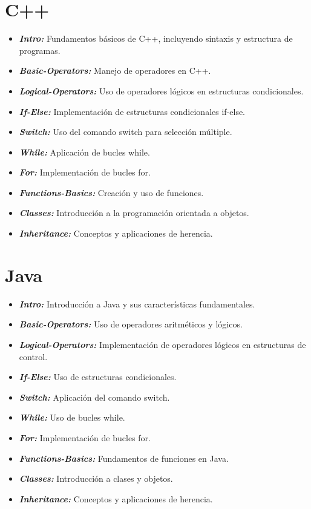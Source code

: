 \begin{appendices}
\section{C++}
\begin{itemize}
    \item \textbf{\textit{Intro:}} Fundamentos básicos de C++, incluyendo sintaxis y estructura de programas.
    \item \textbf{\textit{Basic-Operators:}} Manejo de operadores en C++.
    \item \textbf{\textit{Logical-Operators:}} Uso de operadores lógicos en estructuras condicionales.
    \item \textbf{\textit{If-Else:}} Implementación de estructuras condicionales if-else.
    \item \textbf{\textit{Switch:}} Uso del comando switch para selección múltiple.
    \item \textbf{\textit{While:}} Aplicación de bucles while.
    \item \textbf{\textit{For:}} Implementación de bucles for.
    \item \textbf{\textit{Functions-Basics:}} Creación y uso de funciones.
    \item \textbf{\textit{Classes:}} Introducción a la programación orientada a objetos.
    \item \textbf{\textit{Inheritance:}} Conceptos y aplicaciones de herencia.
\end{itemize}

\section{Java}
\begin{itemize}
    \item \textbf{\textit{Intro:}} Introducción a Java y sus características fundamentales.
    \item \textbf{\textit{Basic-Operators:}} Uso de operadores aritméticos y lógicos.
    \item \textbf{\textit{Logical-Operators:}} Implementación de operadores lógicos en estructuras de control.
    \item \textbf{\textit{If-Else:}} Uso de estructuras condicionales.
    \item \textbf{\textit{Switch:}} Aplicación del comando switch.
    \item \textbf{\textit{While:}} Uso de bucles while.
    \item \textbf{\textit{For:}} Implementación de bucles for.
    \item \textbf{\textit{Functions-Basics:}} Fundamentos de funciones en Java.
    \item \textbf{\textit{Classes:}} Introducción a clases y objetos.
    \item \textbf{\textit{Inheritance:}} Conceptos y aplicaciones de herencia.
\end{itemize}


\end{appendices}
